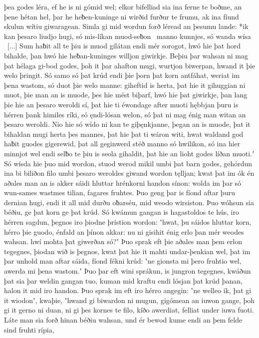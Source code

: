 þea godes léra, ef he is ni gómid wel;
elkor bifelliad sia ina ferne te boðme,
an þene hétan hel, þar he heƀen-kuninge
ni wirðid furður te frumu, ak ina fíund skulun
wítiu giwaragean. Simla gi mid wordun forð
léread an þesumu lande: *ik kan þesaro liudjo hugi,
só mis-líkan muod-seƀon \hld\ manno kunnjes,
só wanda wísa \hld\ [...]
Sum haƀit all te þiu is muod gilátan endi mér sorogot,
hwó hie þat hord bihalde, þan hwó hie heƀan-kuninges
willjon giwirkje. Beþiu þar wahsan ni mag
þat hélaga gi-bod godes, þoh it þar ahafton mugi,
wurtjon biwerpan, hwand it þie welo þringit.
Só samo só þat krúd endi þie þorn þat korn antfáhat,
weriat im þena wastom, só duot þie welo manne:
giheftid is herta, þat hie it gihuggian ni muot,
þie man an is muode, þes hie mést biþarf,
hwó hie þat giwirkje, þan lang þie hie an þesaro weroldi sí,
þat hie ti éwondage after muoti
hębbjan þuru is hérren þank himiles ríki,
só ęndi-lósan welon, só þat ni mag énig man
witan an þesaro weroldi. Nio hie só wído ni kan
te giþęnkjanne, þegan an is muode,
þat it bihaldan mugi herta þes mannes,
þat hie þat ti wáron witi, hwat waldand god haƀit
guodes gigerewid, þat all geginwerd stéð
manno só hwilikon, só ina hier minnjot wel
endi selƀo te þiu is seola gihaldit,
þat hie an lioht godes líðan muoti.ʼ
Só wísda hie þuo mid wordon, stuod werod mikil
umbi þat barn godes, gehórdun ina bi biliðon filo
umbi þesaro weroldes giwand wordon tęlljan;
kwat þat im ók én aðales man an is akker sáidi
hluttar hrénkorni handon sínon:
wolda im þar só wun-sames wastmes tilian,
fagares fruhtes. Þuo geng þar is fíond aftar
þuru dernian hugi, endi it all mid durðu oƀarséu,
mid weodo wirsiston. Þuo wóhsun sia béðiu,
ge þat korn ge þat krúd. Só kwámun gangan
is hagastoldos te hús, iro hérren sagdun,
þegnos iro þiodne þrístion wordon:
ʽhwat, þu sáidos hluttar korn, hérro þie guodo,
énfald an þínon akkar: nu ni gisihit énig erlo þan mér
weodes wahsan. hwí mohta þat giwerðan só?ʼ
Þuo sprak eft þie aðales man þem erlon tegegnes,
þiodan wið is þegnos, kwat þat hie it mahti undar-þenkian wel,
þat im þar unhold man aftar sáida,
fíond fékni krúd: ʽne gionsta mi þero fruhtio wel,
awerda mi þena wastom.ʼ Þuo þar eft wini sprákun,
is jungron tegegnes, kwáðun þat sia þar weldin gangan tuo,
kuman mid kraftu endi lósjan þat krúd þanan,
halon it mid iro handon. Þuo sprak im eft iro hérro angegin:
ʽne welleo ik, þat gi it wiodonʼ, kwaþie, ʽhwand gi biwardon ni mugun,
gigómean an iuwon gange, þoh gi it gerno ni duan,
ni gi þes kornes te filo, kíðo awerdiat,
felliat under iuwa fuoti. Láte man sia forð hinan
béðiu wahsan, und ér bewod kume
endi an þem felde sind fruhti rípia,

